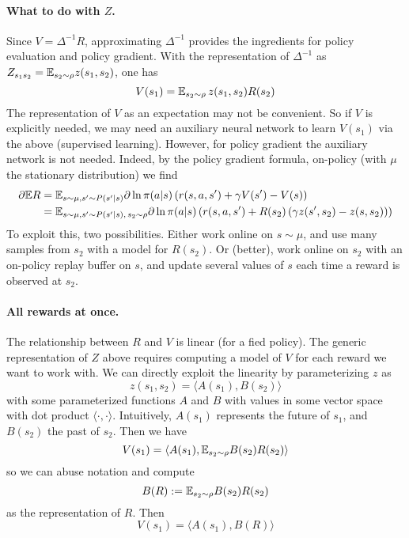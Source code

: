 \documentclass[11pt,a4paper]{article}
\begin{document}
\paragraph{What to do with $Z$.} Since $V=\Delta^{-1}R$, approximating
$\Delta^{-1}$ provides the ingredients for policy evaluation and policy
gradient. With the representation of $\Delta^{-1}$ as
$Z_{s_1s_2}=\mathbb{E}_{s_2\sim \rho} z(s_1,s_2)$, one has
\begin{equation}
V(s_1)=\mathbb{E}_{s_2\sim \rho}\, z(s_1,s_2) R(s_2)
\end{equation}
The representation of $V$ as an expectation may not be convenient. So if
$V$ is explicitly needed, we may need an auxiliary neural network to
learn $V(s_1)$ via the above (supervised learning). However, for policy
gradient the auxiliary network is not needed. Indeed, by the policy
gradient formula, on-policy (with $\mu$ the stationary distribution) we find
\begin{align}
\partial \mathbb{E} R&=
\mathbb{E}_{s\sim \mu,s'\sim P(s'|s)} \partial \ln
\pi(a|s) \left(
r(s,a,s')+\gamma V(s')-V(s)
\right)
\\&=
\mathbb{E}_{s\sim \mu,s'\sim P(s'|s),\,s_2\sim \rho} \partial \ln
\pi(a|s) \left(
r(s,a,s')+R(s_2)\left(\gamma z(s',s_2)-z(s,s_2)\right)
\right)
\end{align}
To exploit this, two possibilities. Either work online on $s\sim \mu$,
and use many samples from $s_2$ with a model for $R(s_2)$. Or (better),
work online on $s_2$ with an on-policy replay buffer on $s$, and update
several values of $s$ each time a reward is observed at $s_2$.

\paragraph{All rewards at once.} The relationship between $R$ and $V$ is
linear (for a fied policy). The generic representation of $Z$ above
requires computing a model of $V$ for each reward we want to work with.
We can directly exploit the linearity by parameterizing $z$ as
\begin{equation}
z(s_1,s_2)=\langle A(s_1),B(s_2)\rangle
\end{equation}
with some parameterized functions $A$ and $B$ with values in some vector
space with dot product $\langle\cdot,\cdot\rangle$. Intuitively, $A(s_1)$
represents the future of $s_1$, and $B(s_2)$ the past of $s_2$.
Then we have
\begin{equation}
V(s_1)=\langle A(s_1),\mathbb{E}_{s_2\sim \rho} B(s_2)R(s_2)\rangle
\end{equation}
so we can abuse notation and compute
\begin{equation}
B(R)\mathrel{\mathop{:}}= \mathbb{E}_{s_2\sim \rho} B(s_2)R(s_2)
\end{equation}
as the representation of $R$. Then
\begin{equation}
V(s_1)=\langle A(s_1),B(R)\rangle
\end{equation}
\end{document}
